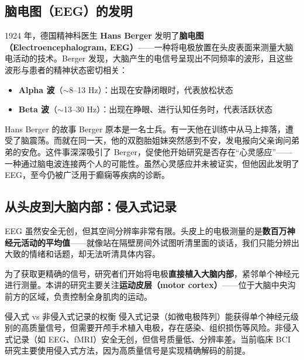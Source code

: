 \documentclass[a4paper]{article}
\begin{document}
\subsection{脑电图（EEG）的发明}





1924 年，德国精神科医生 \textbf{Hans Berger} 发明了\textbf{脑电图（Electroencephalogram, EEG）}——一种将电极放置在头皮表面来测量大脑电活动的技术。Berger 发现，大脑产生的电信号呈现出不同频率的波形，且这些波形与患者的精神状态密切相关：

\begin{itemize}
    \item \textbf{Alpha 波}（$\sim$8--13 Hz）：出现在安静闭眼时，代表放松状态
    \item \textbf{Beta 波}（$\sim$13--30 Hz）：出现在睁眼、进行认知任务时，代表活跃状态
\end{itemize}

\begin{knowledgebox}{Hans Berger 的故事}
Berger 原本是一名士兵。有一天他在训练中从马上摔落，遭受了脑震荡。而就在同一天，他的双胞胎姐妹突然感到不安，发电报向父亲询问弟弟的安危。这件事深深吸引了 Berger，促使他开始研究是否存在``心灵感应''——一种通过脑电波连接两个人的可能性。虽然心灵感应并未被证实，但他因此发明了 EEG，至今仍被广泛用于癫痫等疾病的诊断。
\end{knowledgebox}

\subsection{从头皮到大脑内部：侵入式记录}

EEG 虽然安全无创，但其空间分辨率非常有限。头皮上的电极测量的是\textbf{数百万神经元活动的平均值}——就像站在隔壁房间外试图听清里面的谈话，我们只能分辨出大致的情绪和话题，却无法听清具体内容。




为了获取更精确的信号，研究者们开始将电极\textbf{直接植入大脑内部}，紧邻单个神经元进行测量。本讲的研究主要关注\textbf{运动皮层（motor cortex）}——位于大脑中央沟前方的区域，负责控制全身肌肉的运动。

\begin{warningbox}{侵入式 vs 非侵入式记录的权衡}
侵入式记录（如微电极阵列）能获得单个神经元级别的高质量信号，但需要开颅手术植入电极，存在感染、组织损伤等风险。非侵入式记录（如 EEG、fMRI）安全无创，但信号质量低、分辨率差。当前临床 BCI 研究主要使用侵入式方法，因为高质量信号是实现精确解码的前提。
\end{warningbox}
\end{document}

